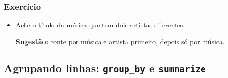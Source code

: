 \documentclass[
  11pt]{report}
\begin{document}
\hypertarget{exercuxedcio-1}{%
\subsubsection{Exercício}\label{exercuxedcio-1}}

\begin{itemize}
\item
  Ache o título da música que tem dois artistas diferentes.

  \textbf{Sugestão:} conte por música e artista primeiro, depois só por música.
\end{itemize}

\hypertarget{agrupando-linhas-group_by-e-summarize}{%
\subsection{\texorpdfstring{Agrupando linhas: \texttt{group\_by} e \texttt{summarize}}{Agrupando linhas: group\_by e summarize}}\label{agrupando-linhas-group_by-e-summarize}}
\end{document}
